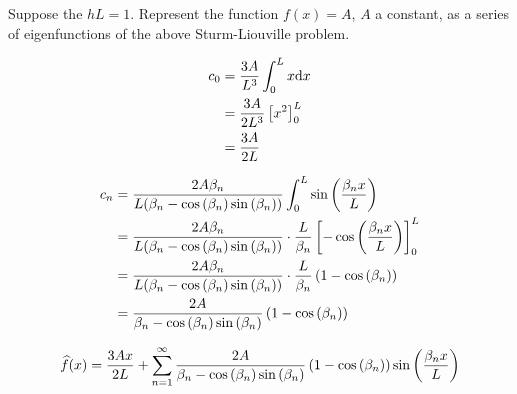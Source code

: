Suppose the $hL = 1$. Represent the function $f(x) = A$, $A$ a constant, as a series of
eigenfunctions of the above Sturm-Liouville problem.

\soln*

\begin{align*}
    c_0 &= \frac{3A}{L^3} \intl x \dd x \\
    &= \frac{3A}{2L^3} \brac{x^2}_{0}^L\\
    &= \frac{3A}{2L}
\end{align*}

\begin{align*}
    c_n &=
    \frac{2A\beta_n}{L(\beta_n - \cosp{\beta_n} \sinp{\beta_n})} \intl \sinp{\frac{\beta_n x}{L}}\\
    &= \frac{2A\beta_n}{L(\beta_n - \cosp{\beta_n} \sinp{\beta_n})} \cdot \frac{L}{\beta_n} \brac{-
        \cosp{\frac{\beta_n x}{L}}
    }_0^L \\
    &= \frac{2A\beta_n}{L(\beta_n - \cosp{\beta_n} \sinp{\beta_n})} \cdot \frac{L}{\beta_n} \pars{
        1-\cosp{\beta_n}
    } \\
    &= \frac{2A}{\beta_n - \cosp{\beta_n} \sinp{\beta_n}} \pars{
        1-\cosp{\beta_n}
    } \\
\end{align*}

$$\widehat{f}(x) = \frac{3Ax}{2L} + \sumn{1} \frac{2A}{\beta_n - \cosp{\beta_n} \sinp{\beta_n}} \pars{
    1-\cosp{\beta_n}
} \sinp{\frac{\beta_n x}{L}} $$